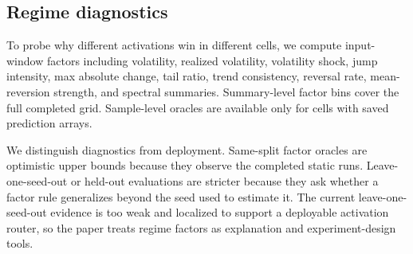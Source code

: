 \subsection{Regime diagnostics}

To probe why different activations win in different cells, we compute input-window factors including volatility, realized volatility, volatility shock, jump intensity, max absolute change, tail ratio, trend consistency, reversal rate, mean-reversion strength, and spectral summaries. Summary-level factor bins cover the full completed grid. Sample-level oracles are available only for cells with saved prediction arrays.

We distinguish diagnostics from deployment. Same-split factor oracles are optimistic upper bounds because they observe the completed static runs. Leave-one-seed-out or held-out evaluations are stricter because they ask whether a factor rule generalizes beyond the seed used to estimate it. The current leave-one-seed-out evidence is too weak and localized to support a deployable activation router, so the paper treats regime factors as explanation and experiment-design tools.

